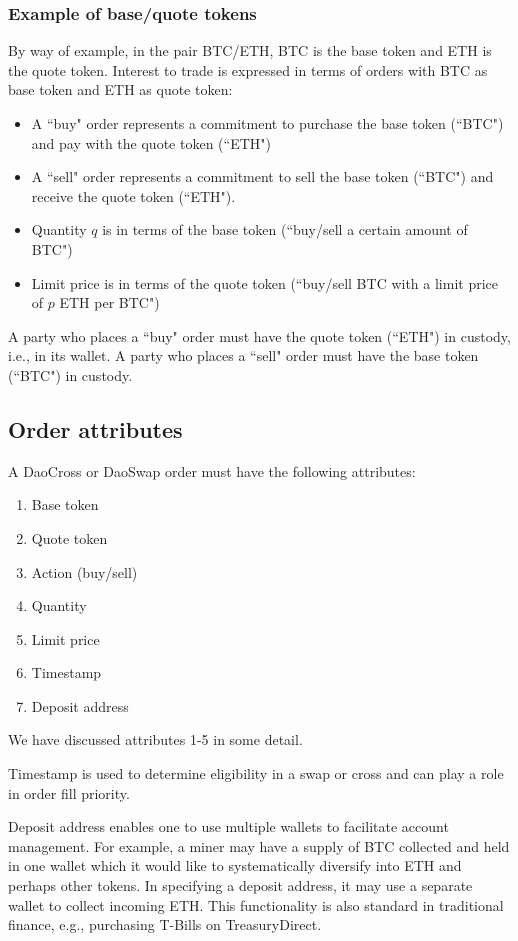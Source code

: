 \documentclass[11pt, reqno]{amsart}
\begin{document}
\subsubsection{Example of base/quote tokens}
By way of example, in the pair BTC/ETH, BTC is the base token and ETH is the
quote token. Interest to trade is expressed in terms of orders with BTC as
base token and ETH as quote token:
\begin{itemize}
	\item A ``buy" order represents a commitment to purchase the base token
	      (``BTC") and pay with the quote token (``ETH")
	\item A ``sell" order represents a commitment to sell the base token
	      (``BTC") and receive the quote token (``ETH").
	\item Quantity $q$ is in terms of the base token (``buy/sell a certain
	      amount of BTC")
	\item Limit price is in terms of the quote token (``buy/sell BTC with a
	      limit price of $p$ ETH per BTC")
\end{itemize}

A party who places a ``buy" order must have the quote token (``ETH") in custody,
i.e., in its wallet. A party who places a ``sell" order must have the base
token (``BTC") in custody.

\subsection{Order attributes}
A DaoCross or DaoSwap order must have the following attributes:
\begin{enumerate}
	\item Base token
	\item Quote token
	\item Action (buy/sell)
	\item Quantity
	\item Limit price
	\item Timestamp
	\item Deposit address
\end{enumerate}
We have discussed attributes 1-5 in some detail.

Timestamp is used to determine eligibility in a swap or cross and can play a
role in order fill priority.

Deposit address enables one to use multiple wallets to facilitate account
management. For example, a miner may have a supply of BTC collected and held in
one wallet which it would like to systematically diversify into ETH and perhaps
other tokens. In specifying a deposit address, it may use a separate wallet to
collect incoming ETH. This functionality is also standard in traditional
finance, e.g., purchasing T-Bills on TreasuryDirect.
\end{document}

